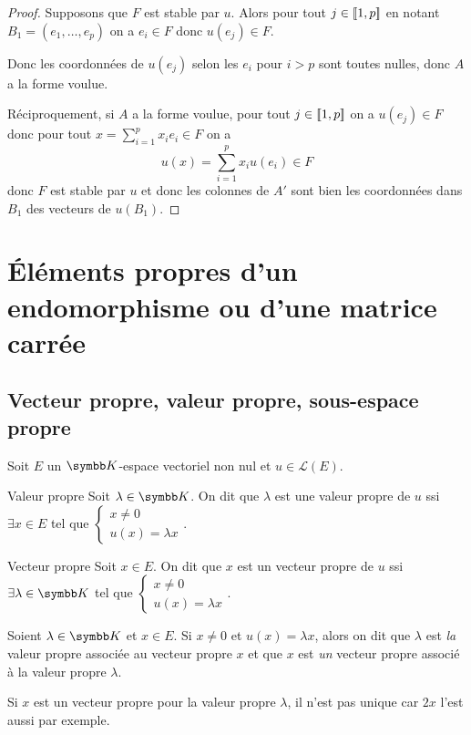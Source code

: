 \begin{proof}
    Supposons que $F$ est stable par $u$. Alors pour tout $j \in [\![1, p]\!] $ en notant 
    $B_1 = (e_1, \ldots, e_p)$ on a $e_i \in F$ donc $u(e_j) \in F$. 

    Donc les coordonnées de $u(e_j)$ selon les $e_i$ pour $i > p$ sont toutes nulles, donc 
    $A$ a la forme voulue.

    \lvspace Réciproquement, si $A$ a la forme voulue, pour tout $j \in [\![1, p]\!]$ on a
    $u(e_j) \in F$ donc pour tout $x = \sum_{i = 1}^p x_i e_i \in F$ on a
    \[
        u(x) = \sum_{i = 1}^p x_i u(e_i) \in F
    \]
    donc $F$ est stable par $u$ et donc les colonnes de $A'$ sont bien les coordonnées dans $B_1$ 
    des vecteurs de $u(B_1)$.
\end{proof}


\section{\'Eléments propres d'un endomorphisme ou d'une matrice carrée }
\subsection{Vecteur propre, valeur propre, sous-espace propre }

Soit $E$ un $\K$-espace vectoriel non nul et $u \in \mathscr L(E)$.

\begin{definition}{Valeur propre}{}
    Soit $\lambda \in \K$. On dit que $\lambda$ est une valeur propre de $u$ ssi
    $\exists x \in E$ tel que $\begin{cases} x \neq 0 \\ u(x) = \lambda x \end{cases}$.
\end{definition}

\begin{definition}{Vecteur propre}{}
    Soit $x \in E$. On dit que $x$ est un vecteur propre de $u$ ssi
    $\exists \lambda \in \K$ tel que $\begin{cases} x \neq 0 \\ u(x) = \lambda x \end{cases}$.
\end{definition}

\begin{remarque}
    Soient $\lambda \in \K$ et $x \in E$. Si $x \neq 0$ et $u(x) = \lambda x$, alors 
    on dit que $\lambda$ est \emph{la} valeur propre associée au vecteur propre $x$ et 
    que $x$ est \emph{un} vecteur propre associé à la valeur propre $\lambda$.

    Si $x$ est un vecteur propre pour la valeur propre $\lambda$, il n'est pas unique 
    car $2x$ l'est aussi par exemple.
\end{remarque}

